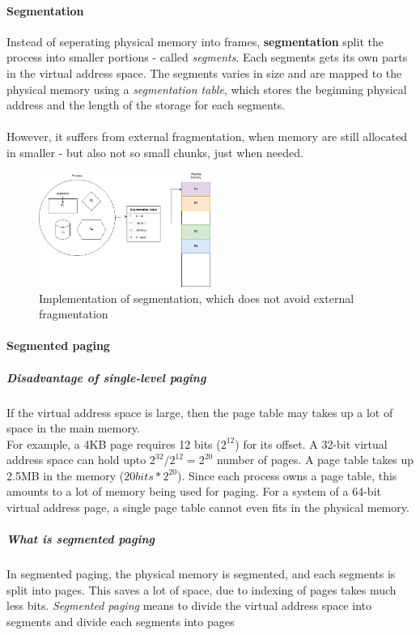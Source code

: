 \documentclass[]{article}
\begin{document}
\paragraph{Segmentation}
Instead of seperating physical memory into frames, \textbf{segmentation} split the process into smaller portions - called \textit{segments}. Each segments gets its own parts in the virtual address space. The segments varies in size and are mapped to the physical memory using a \textit{segmentation table}, which stores the beginning physical address and the length of the storage for each segments. \\
\\
However, it suffers from external fragmentation, when memory are still allocated in smaller - but also not so small chunks, just when needed.
\newpage
\begin{figure}[h]
	\caption{Implementation of segmentation, which does not avoid external fragmentation}
	\centering
	\vspace*{5mm}
	\includegraphics[width=0.5\textwidth]{content/segmentation.png}
\end{figure}
\paragraph{Segmented paging}
\subparagraph{Disadvantage of single-level paging}
If the virtual address space is large, then the page table may takes up a lot of space in the main memory.\\
For example, a 4KB page requires 12 bits ($2^{12}$) for its offset. A 32-bit virtual address space can hold upto $2^{32} / 2^{12} = 2^{20}$ number of pages. A page table takes up 2.5MB in the memory ($20 bits *2^{20}$). Since each process owns a page table, this amounts to a lot of memory being used for paging. For a system of a 64-bit virtual address page, a single page table cannot even fits in the physical memory.
\subparagraph{What is segmented paging}
In segmented paging, the physical memory is segmented, and each segments is split into pages. This saves a lot of space, due to indexing of pages takes much less bits. \textit{Segmented paging} means to divide the virtual address space into segments and divide each segments into pages
\end{document}
